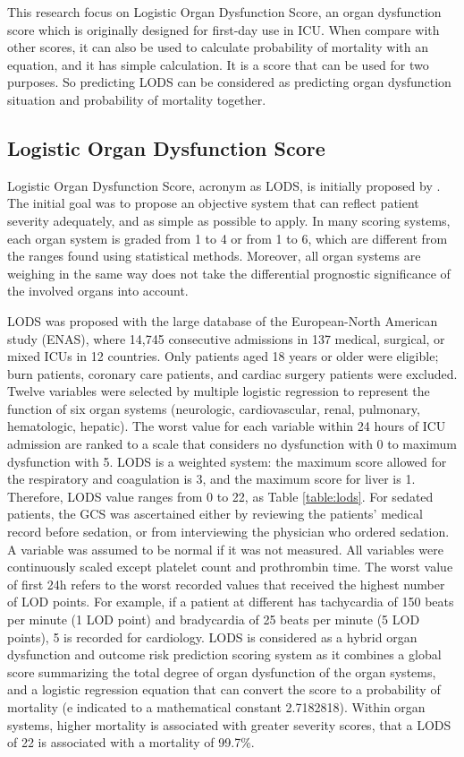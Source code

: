 \documentclass[12pt,a4paper,english
]{tunithesis}
\begin{document}
This research focus on Logistic Organ Dysfunction Score, an organ dysfunction score which is originally designed for first-day use in ICU. When compare with other scores, it can also be used to calculate probability of mortality with an equation, and it has simple calculation. It is a score that can be used for two purposes. So predicting LODS can be considered as predicting organ dysfunction situation and probability of mortality together. 

\subsection{Logistic Organ Dysfunction Score}
Logistic Organ Dysfunction Score, acronym as LODS, is initially proposed by \textcite{legall96}. The initial goal was to propose an objective system that can reflect  patient severity adequately, and as simple as possible to apply.  In many scoring systems, each organ system is graded from 1 to 4 or from 1 to 6, which are different from the ranges found using statistical methods. Moreover, all organ systems are weighing in the same way does not take the differential prognostic significance of the involved organs into account. 

LODS was proposed with the large database of the European-North American study (ENAS), where 14,745 consecutive admissions in 137 medical, surgical, or mixed ICUs in 12 countries. Only patients aged 18 years or older were eligible; burn patients, coronary care patients, and cardiac surgery patients were excluded. Twelve variables were selected by multiple logistic regression to represent the function of six organ systems (neurologic, cardiovascular, renal, pulmonary, hematologic, hepatic). The worst value for each variable within 24 hours of ICU admission are ranked to a scale that considers no dysfunction with 0 to maximum dysfunction with 5. LODS is a weighted system: the maximum score allowed for the respiratory and coagulation is 3, and the maximum score for liver is 1. Therefore, LODS value ranges from 0 to 22, as Table \ref{table:lods}. For sedated patients, the GCS was ascertained either by reviewing the patients' medical record before sedation, or from interviewing the physician who ordered sedation. A variable was assumed to be normal if it was not measured. All variables were continuously scaled except platelet count and prothrombin time. The worst value of first 24h refers to the worst recorded values that received the highest number of LOD points. For example, if a patient at different has tachycardia of 150 beats per minute (1 LOD point) and bradycardia of 25 beats per minute (5 LOD points), 5 is recorded for cardiology. LODS is considered as a hybrid organ dysfunction and outcome risk prediction scoring system as it combines a global score summarizing the total degree of organ dysfunction of the organ systems, and a logistic regression equation that can convert the score to a probability of mortality (e indicated to a mathematical constant 2.7182818). Within organ systems, higher mortality is associated with greater severity scores, that a LODS of 22 is associated with a mortality of 99.7\%. \parencite{Tiffany21, Vincent2010, sekulic2015}
\end{document}
